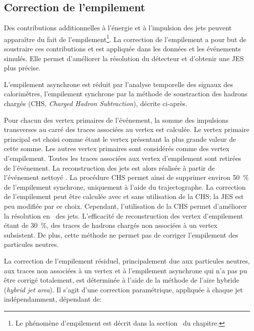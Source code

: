 \subsection{Correction de l'empilement}\label{chapter-JERC-section-CMS-subsec-PU}
Des contributions additionnelles à l'énergie et à l'impulsion des jets peuvent apparaître du fait de l'empilement\footnote{Le phénomène d'empilement est décrit dans la section~ du chapitre.}.
La correction de l'empilement a pour but de soustraire ces contributions et est appliquée dans les données et les événements simulés.
Elle permet d'améliorer la résolution du détecteur et d'obtenir une JES plus précise.
\par L'empilement asynchrone est réduit par l'analyse temporelle des signaux des calorimètres,
l'empilement synchrone par la méthode de soustraction des hadrons chargés (CHS, \emph{Charged Hadron Subtraction}), décrite ci-après.
\par Pour chacun des vertex primaires de l'événement, la somme des impulsions transverses au carré des traces associées au vertex est calculée.
Le vertex primaire principal est choisi comme étant le vertex présentant la plus grande valeur de cette somme.
Les autres vertex primaires sont considérés comme des vertex d'empilement.
Toutes les traces associées aux vertex d'empilement sont retirées de l'événement.
La reconstruction des jets est alors réalisée à partir de l'événement \og nettoyé \fg.
La procédure CHS permet ainsi de supprimer environ \SI{50}{\%} de l'empilement synchrone, uniquement à l'aide du trajectographe.
La correction de l'empilement peut être calculée avec et sans utilisation de la CHS; la JES est peu modifiée par ce choix. Cependant, l'utilisation de la CHS permet d'améliorer la résolution en \pT\ des jets.
L'efficacité de reconstruction des vertex d'empilement étant de \SI{30}{\%}, des traces de hadrons chargés non associées à un vertex subsistent.
De plus, cette méthode ne permet pas de corriger l'empilement des particules neutres.
\par La correction de l'empilement résiduel, principalement due aux particules neutres, aux traces non associées à un vertex et à l'empilement asynchrone qui n'a pas pu être corrigé totalement, est déterminée à l'aide de la méthode de l'aire hybride (\emph{hybrid jet area}).
Il s'agit d'une correction paramétrique, appliquée à chaque jet indépendamment, dépendant de:

